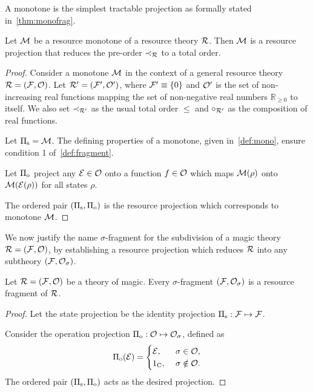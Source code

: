 A monotone is the simplest tractable projection as formally stated in~\cref{thm:monofrag}.
\begin{proposition}\label{thm:monofrag}
	Let $\mathcal{M}$ be a resource monotone of a resource theory $\mathcal{R}$. 
	Then $\mathcal{M}$ is a resource projection that reduces the pre-order $\prec_{\mathcal{R}}$ to a total order.
\end{proposition}
\begin{proof}
	Consider a monotone $\mathcal{M}$ in the context of a general resource theory $\mathcal{R} = (\mathcal{F}, \mathcal{O})$.
	Let $\mathcal{R}' = (\mathcal{F}', \mathcal{O}')$, where $\mathcal{F}' \equiv \{0\}$ and $\mathcal{O}'$ is the set of non-increasing real functions mapping the set of non-negative real numbers $\mathbb{R}_{\geq 0}$ to itself. 
	We also set $\prec_{\mathcal{R}'}$ as the usual total order $\leq$ and $\circ_{\mathcal{R}'}$ as the composition of real functions.
	
	Let $\Pi_{\rm{s}} = \mathcal{M}$.
	The defining properties of a monotone, given in~\cref{def:mono}, ensure condition 1 of~\cref{def:fragment}.
	
	Let $\Pi_{\rm{o}}$ project any $\mathcal{E} \in \mathcal{O}$ onto a function $f \in \mathcal{O}$ which maps $\mathcal{M}(\rho)$ onto $\mathcal{M}(\mathcal{E}(\rho))$ for all states $\rho$.
	
	The ordered pair $(\Pi_{\rm{s}}, \Pi_{\rm{o}})$ is the resource projection which corresponds to monotone $\mathcal{M}$.
\end{proof}

We now justify the name $\sigma$-fragment for the subdivision of a magic theory $\mathcal{R} = (\mathcal{F}, \mathcal{O})$, by establishing a resource projection which reduces $\mathcal{R}$ into any subtheory $(\mathcal{F}, \mathcal{O}_\sigma)$.
\begin{proposition}
    Let $\mathcal{R} = (\mathcal{F}, \mathcal{O})$ be a theory of magic.
    Every $\sigma$-fragment $(\mathcal{F}, \mathcal{O}_\sigma)$ is a resource fragment of $\mathcal{R}$.
\end{proposition}
\begin{proof}
    Let the state projection be the identity projection $\Pi_{\rm{s}}:\mathcal{F}\mapsto\mathcal{F}$.
    
    Consider the operation projection $\Pi_{\rm{o}}:\mathcal{O} \mapsto \mathcal{O}_\sigma$, defined as
    \begin{equation}
    \Pi_{\rm{o}}(\mathcal{E}) =
    \begin{cases}
        \mathcal{E},\ &\sigma \in \mathcal{O}, \\
        1_{\rm{C}},\ &\sigma \notin \mathcal{O}.
    \end{cases}
    \end{equation}
    The ordered pair $(\Pi_{\rm{s}}, \Pi_{\rm{o}})$ acts as the desired projection.
\end{proof}

